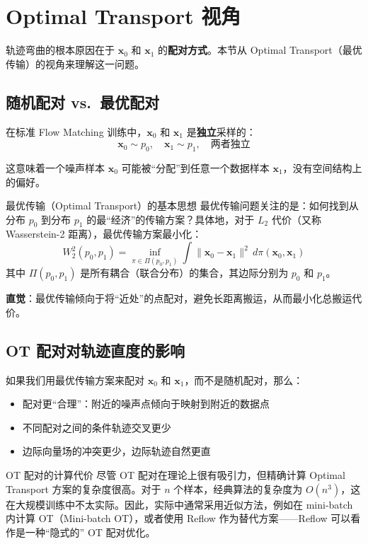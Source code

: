 \section{Optimal Transport 视角}

轨迹弯曲的根本原因在于 $\mathbf{x}_0$ 和 $\mathbf{x}_1$ 的\textbf{配对方式}。本节从 Optimal Transport（最优传输）的视角来理解这一问题。

\subsection{随机配对 vs.\ 最优配对}

在标准 Flow Matching 训练中，$\mathbf{x}_0$ 和 $\mathbf{x}_1$ 是\textbf{独立}采样的：
$$\mathbf{x}_0 \sim p_0, \quad \mathbf{x}_1 \sim p_1, \quad \text{两者独立}$$

这意味着一个噪声样本 $\mathbf{x}_0$ 可能被``分配''到任意一个数据样本 $\mathbf{x}_1$，没有空间结构上的偏好。

\begin{importantbox}{最优传输（Optimal Transport）的基本思想}
最优传输问题关注的是：如何找到从分布 $p_0$ 到分布 $p_1$ 的最``经济''的传输方案？具体地，对于 $L_2$ 代价（又称 Wasserstein-2 距离），最优传输方案最小化：
$$W_2^2(p_0, p_1) = \inf_{\pi \in \Pi(p_0, p_1)} \int \|\mathbf{x}_0 - \mathbf{x}_1\|^2 \, d\pi(\mathbf{x}_0, \mathbf{x}_1)$$
其中 $\Pi(p_0, p_1)$ 是所有耦合（联合分布）的集合，其边际分别为 $p_0$ 和 $p_1$。

\medskip
\textbf{直觉}：最优传输倾向于将``近处''的点配对，避免长距离搬运，从而最小化总搬运代价。
\end{importantbox}

\subsection{OT 配对对轨迹直度的影响}

如果我们用最优传输方案来配对 $\mathbf{x}_0$ 和 $\mathbf{x}_1$，而不是随机配对，那么：

\begin{itemize}
    \item 配对更``合理''：附近的噪声点倾向于映射到附近的数据点
    \item 不同配对之间的条件轨迹交叉更少
    \item 边际向量场的冲突更少，边际轨迹自然更直
\end{itemize}

\begin{warningbox}{OT 配对的计算代价}
尽管 OT 配对在理论上很有吸引力，但精确计算 Optimal Transport 方案的复杂度很高。对于 $n$ 个样本，经典算法的复杂度为 $O(n^3)$，这在大规模训练中不太实际。因此，实际中通常采用近似方法，例如在 mini-batch 内计算 OT（Mini-batch OT），或者使用 Reflow 作为替代方案——Reflow 可以看作是一种``隐式的'' OT 配对优化。
\end{warningbox}

